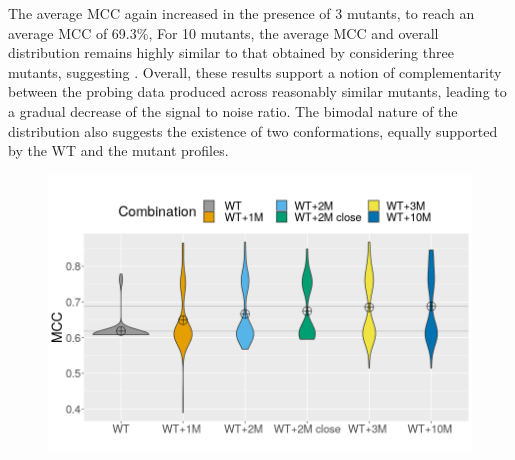 \documentclass[a4,center,fleqn]{NAR}
\begin{document}
The average MCC again increased in the presence of 3 mutants, to reach an average MCC of 69.3\%,  For 10 mutants, the average MCC and overall distribution remains highly similar to that obtained by considering three mutants, suggesting . Overall, these results support a notion of complementarity between the probing data produced across reasonably similar mutants, leading to a gradual decrease of the signal to noise ratio. The bimodal nature of the distribution also suggests the existence of two conformations, equally supported by the WT and the mutant profiles.

\begin{figure}
	{\centering
		\includegraphics[width=\linewidth]{graphs/combinationscale.png}\\}
		
	\caption{ }\label{fig:variantanalysis}
\end{figure}


\end{document}

